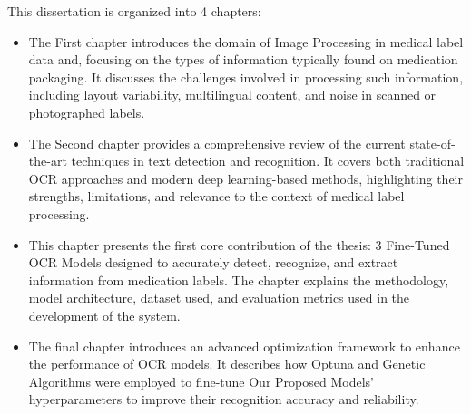 This dissertation is organized into 4 chapters:
\begin{comment}
    
\begin{itemize}
    \item The first chapter will talk about the Medical Label Information Processing.
    \item The second chapter will consist of the Existing Text Recognition Methods.
    \item The third chapter represents our First Contribution and proposed approach for medication labels recognition and extraction problem.
    \item The fourth chapter presents our Second Contribution which is the Hyperparameter Optimization of the OCR models using Optuna and Genetic Algorithms.
\end{itemize}
\end{comment}
\begin{itemize}
    \item 
    The First chapter introduces the domain of Image Processing in medical label data and, focusing on the types of information typically found on medication packaging. It discusses the challenges involved in processing such information, including layout variability, multilingual content, and noise in scanned or photographed labels.

    \item
    The Second chapter provides a comprehensive review of the current state-of-the-art techniques in text detection and recognition. It covers both traditional OCR approaches and modern deep learning-based methods, highlighting their strengths, limitations, and relevance to the context of medical label processing.

    \item 
    This chapter presents the first core contribution of the thesis: 3 Fine-Tuned OCR Models designed to accurately detect, recognize, and extract information from medication labels. The chapter explains the methodology, model architecture, dataset used, and evaluation metrics used in the development of the system.
    
    \item
    The final chapter introduces an advanced optimization framework to enhance the performance of OCR models. It describes how Optuna and Genetic Algorithms were employed to fine-tune Our Proposed Models' hyperparameters to improve their recognition accuracy and reliability.
\end{itemize}